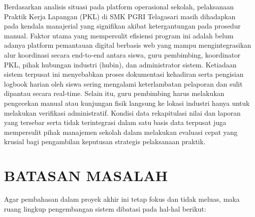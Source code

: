 Berdasarkan analisis situasi pada platform operasional sekolah, pelaksanaan Praktik Kerja Lapangan (PKL) di SMK PGRI Telagasari masih dihadapkan pada kendala manajerial yang signifikan akibat ketergantungan pada prosedur manual. Faktor utama yang mempersulit efisiensi program ini adalah belum adanya platform pemantauan digital berbasis web yang mampu mengintegrasikan alur koordinasi secara end-to-end antara siswa, guru pembimbing, koordinator PKL, pihak hubungan industri (hubin), dan administrator sistem. Ketiadaan sistem terpusat ini menyebabkan proses dokumentasi kehadiran serta pengisian logbook harian oleh siswa sering mengalami keterlambatan pelaporan dan sulit dipantau secara real-time. Selain itu, guru pembimbing harus melakukan pengecekan manual atau kunjungan fisik langsung ke lokasi industri hanya untuk melakukan verifikasi administratif. Kondisi data rekapitulasi nilai dan laporan yang tersebar serta tidak terintegrasi dalam satu basis data terpusat juga mempersulit pihak manajemen sekolah dalam melakukan evaluasi cepat yang krusial bagi pengambilan keputusan strategis pelaksanaan praktik.

\section{BATASAN MASALAH}

Agar pembahasan dalam proyek akhir ini tetap fokus dan tidak meluas, maka ruang lingkup pengembangan sistem dibatasi pada hal-hal berikut:


